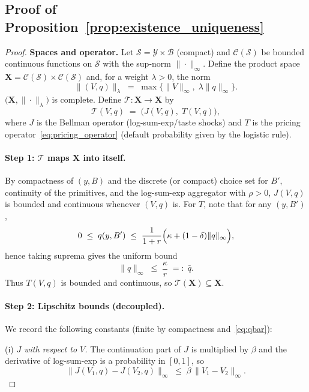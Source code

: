 \documentclass[12pt]{article}
\providecommand{\eqqcolon}{=\mathrel{\mathop:}}
\theoremstyle{plain}
\begin{document}
\subsection{Proof of Proposition~\ref{prop:existence_uniqueness}}
\label{app:proof_existence_uniqueness}

\begin{proof}
	\textbf{Spaces and operator.}
	Let $\mathcal S=\mathcal Y\times\mathcal B$ (compact) and
	$\mathcal C(\mathcal S)$ be bounded continuous functions on $\mathcal S$ with the sup-norm $\|\cdot\|_\infty$.
	Define the product space $\mathbf X=\mathcal C(\mathcal S)\times\mathcal C(\mathcal S)$ and, for a weight $\lambda>0$, the norm
	\[
		\|(V,q)\|_\lambda \;=\; \max\{\|V\|_\infty,\;\lambda\|q\|_\infty\}.
	\]
	$\bigl(\mathbf X,\|\cdot\|_\lambda\bigr)$ is complete.
	Define $\mathcal T:\mathbf X\to\mathbf X$ by
	\[
		\mathcal T(V,q) \;=\; \bigl(J(V,q),\;T(V,q)\bigr),
	\]
	where $J$ is the Bellman operator (log-sum-exp/taste shocks) and $T$ is the
	pricing operator~\eqref{eq:pricing_operator} (default probability given by the
	logistic rule).

	\paragraph{Step 1: $\mathcal T$ maps $\mathbf X$ into itself.}
	By compactness of $(y,B)$ and the discrete (or compact) choice set for $B'$,
	continuity of the primitives, and the log-sum-exp aggregator with $\rho>0$,
	$J(V,q)$ is bounded and continuous whenever $(V,q)$ is. For $T$, note that for
	any $(y,B')$,
	\[
		0 \;\le\; q(y,B') \;\le\; \frac{1}{1+r}\Bigl(\kappa + (1-\delta)\|q\|_\infty\Bigr),
	\]
	hence taking suprema gives the uniform bound
	\begin{equation}
		\label{eq:qbar}
		\|q\|_\infty \;\le\; \frac{\kappa}{r}\;\eqqcolon\;\bar q.
	\end{equation}
	Thus $T(V,q)$ is bounded and continuous, so $\mathcal T(\mathbf X)\subseteq\mathbf X$.

	\paragraph{Step 2: Lipschitz bounds (decoupled).}
	We record the following constants (finite by compactness and~\eqref{eq:qbar}):

	\medskip
	(i) \emph{$J$ with respect to $V$.}
	The continuation part of $J$ is multiplied by $\beta$ and the derivative of log-sum-exp is a probability in $[0,1]$, so
	\[
		\|J(V_1,q)-J(V_2,q)\|_\infty \;\le\; \beta\,\|V_1-V_2\|_\infty.
	\]


\end{proof}
\end{document}
